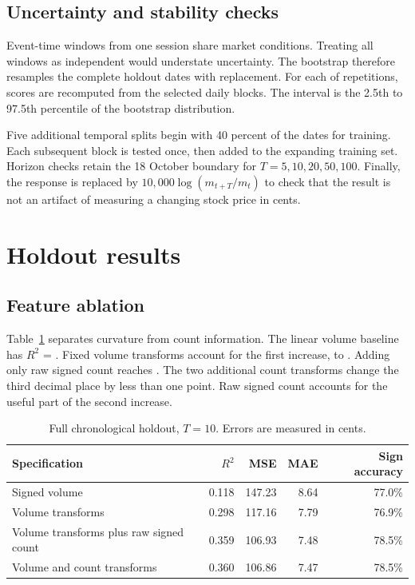 \documentclass[11pt,a4paper]{article}
\newcommand{\Rtwo}{\ensuremath{R^2}}
\begin{document}
\subsection{Uncertainty and stability checks}

Event-time windows from one session share market conditions. Treating all
windows as independent would understate uncertainty. The bootstrap therefore
resamples the \BootstrapClusters{} complete holdout dates with replacement. For
each of \BootstrapReplicates{} repetitions, scores are recomputed from the
selected daily blocks. The interval is the 2.5th to 97.5th percentile of the
bootstrap distribution.

Five additional temporal splits begin with 40 percent of the dates for
training. Each subsequent block is tested once, then added to the expanding
training set. Horizon checks retain the 18 October boundary for
$T=5,10,20,50,100$.
Finally, the response is replaced by
$10{,}000\log(m_{t+T}/m_t)$ to check that the result is not an artifact of
measuring a changing stock price in cents.

\section{Holdout results}

\subsection{Feature ablation}

Table~\ref{tab:models} separates curvature from count information. The linear
volume baseline has \Rtwo{} = \BaselineRtwo{}. Fixed volume transforms account
for the first increase, to \VolumeRtwo{}. Adding only raw signed count reaches
\RawCountRtwo{}. The two additional count transforms change the third decimal
place by less than one point. Raw signed count accounts for the useful part of
the second increase.

\begin{table}[H]
  \centering
  \caption{Full chronological holdout, $T=10$. Errors are measured in cents.}
  \label{tab:models}
  \begin{tabular}{lrrrr}
    \toprule
    Specification & \Rtwo{} & MSE & MAE & Sign accuracy \\
    \midrule
    Signed volume & 0.118 & 147.23 & 8.64 & 77.0\% \\
    Volume transforms & 0.298 & 117.16 & 7.79 & 76.9\% \\
    Volume transforms plus raw signed count & 0.359 & 106.93 & 7.48 & 78.5\% \\
    Volume and count transforms & 0.360 & 106.86 & 7.47 & 78.5\% \\
    \bottomrule
  \end{tabular}
\end{table}
\end{document}
